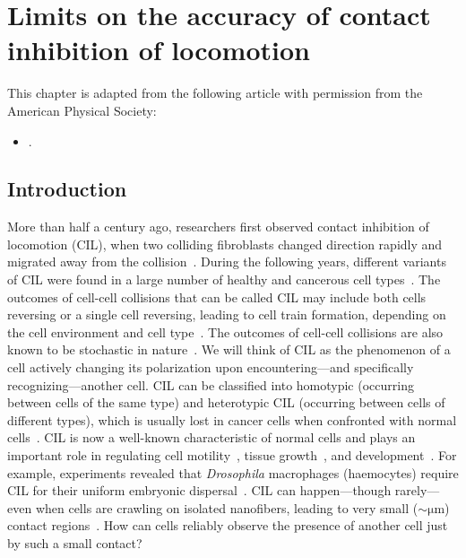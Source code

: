 \chapter{Limits on the accuracy of contact inhibition of locomotion}
\label{chap:cil}

\begin{singlespace}
    This chapter is adapted from the following article with permission from the American Physical Society:

    \begin{itemize}
        \item {}.
    \end{itemize}
\end{singlespace}


\section{Introduction}
\label{sec:ch5:intro}

More than half a century ago, researchers first observed contact inhibition of locomotion (CIL), when two colliding fibroblasts changed direction rapidly and migrated away from the collision~\cite{abercrombie1970contact, mayor2010keeping, abercrombie1979contact, zadeh2022picking, singh2021rules}.
During the following years, different variants of CIL were found in a large number of healthy and cancerous cell types~\cite{mayor2010keeping}.
The outcomes of cell-cell collisions that can be called CIL may include both cells reversing or a single cell reversing, leading to cell train formation, depending on the cell environment and cell type~\cite{scarpa2013novel, desai2013contact, singh2021rules, kulawiak2016modeling, bruckner2021learning, li2018coordination}.
The outcomes of cell-cell collisions are also known to be stochastic in nature~\cite{desai2013contact, singh2021rules, scarpa2013novel}.
We will think of CIL as the phenomenon of a cell actively changing its polarization upon encountering---and specifically recognizing---another cell.
CIL can be classified into homotypic (occurring between cells of the same type) and heterotypic CIL (occurring between cells of different types), which is usually lost in cancer cells when confronted with normal cells~\cite{mayor2010keeping}.
CIL is now a well-known characteristic of normal cells and plays an important role in regulating cell motility~\cite{singh2021rules, zadeh2022picking}, tissue growth~\cite{zimmermann2016contact}, and development~\cite{larranaga2022ephrin, lin2015interplay, davis2012emergence}.
For example, experiments revealed that \textit{Drosophila} macrophages (haemocytes) require CIL for their uniform embryonic dispersal~\cite{davis2012emergence, stramer2010clasp}.
CIL can happen---though rarely---even when cells are crawling on isolated nanofibers, leading to very small ($\sim \mathrm{\mu m}$) contact regions~\cite{singh2021rules}.
How can cells reliably observe the presence of another cell just by such a small contact?

